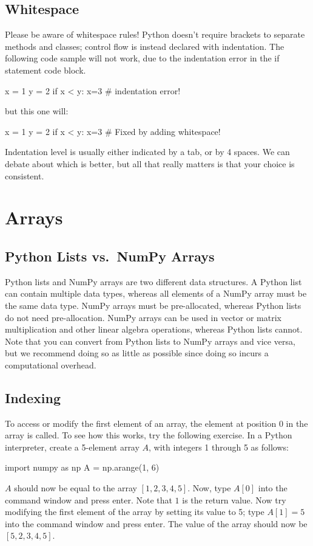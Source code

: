 \documentclass{article}
\begin{document}
\subsection{Whitespace}
Please be aware of whitespace rules! Python doesn't require brackets to separate methods and classes; control flow is instead declared with indentation. The following code sample will not work, due to the indentation error in the if statement code block.
\begin{python}
x = 1
y = 2
if x < y:
x=3 # indentation error!
\end{python}
but this one will:
\begin{python}
x = 1
y = 2
if x < y:
    x=3 # Fixed by adding whitespace!
\end{python}
Indentation level is usually either indicated by a tab, or by 4 spaces. We can debate about which is better, but all that really matters is that your choice is consistent.


\section{Arrays}
\subsection{Python Lists vs.~NumPy Arrays}
Python lists and NumPy arrays are two different data structures. A Python list can contain multiple data types, whereas all elements of a NumPy array must be the same data type. NumPy arrays must be pre-allocated, whereas Python lists do not need pre-allocation. NumPy arrays can be used in vector or matrix multiplication and other linear algebra operations, whereas Python lists cannot. Note that you can convert from Python lists to NumPy arrays and vice versa, but we recommend doing so as little as possible since doing so incurs a computational overhead.

\subsection{Indexing}
To access or modify the first element of an array, the element at position 0 in the array is called. To see how this works, try the following exercise.
In a Python interpreter, create a 5-element array $A$, with integers 1 through 5 as follows:
\begin{python}
import numpy as np
A = np.arange(1, 6)
\end{python}

$A$ should now be equal to the array $[1,2,3,4,5]$.
Now, type $A[0]$ into the command window and press enter. Note that $1$ is the return value.
Now try modifying the first element of the array by setting its value to 5; type $A[1]=5$ into the command window and press enter. The value of the array should now be $[5,2,3,4,5]$.
\end{document}
